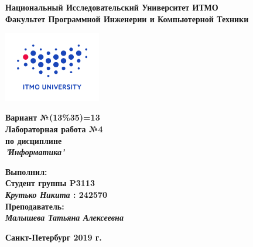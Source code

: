 \documentclass[11pt]{article}
\author{Krutko Nikita / KrutNA}
\date{\today}
\title{}
\begin{document}
\large
\thispagestyle{empty}
\begin{center}
\textbf{Национальный Исследовательский Университет ИТМО}\\
\textbf{Факультет Программной Инженерии и Компьютерной Техники}\\
\end{center}
\vspace{2em}
\begin{center}
\includegraphics[width=120pt]{./itmo-logo.png}
\end{center}
\LARGE
\vspace{5em}
\begin{center}
\textbf{Вариант №(13\%35)=13}\\
\textbf{Лабораторная работа №4}\\
\Large
\textbf{по дисциплине}\\
\LARGE
\textbf{\emph{'Информатика'}}\\
\end{center}
\vspace{11em}
\large
\begin{flushright}
\textbf{Выполнил:}\\
\textbf{Студент группы P3113}\\
\textbf{\emph{Крутько Никита} : 242570}\\
\textbf{Преподаватель:}\\
\textbf{\emph{Малышева Татьяна Алексеевна}}\\
\end{flushright}
\vspace{4em}
\large
\begin{center}
\textbf{Санкт-Петербург 2019 г.}
\end{center}
\pagebreak{}
\setcounter{tocdepth}{2}
\tableofcontents
\vspace{2em}
\end{document}
